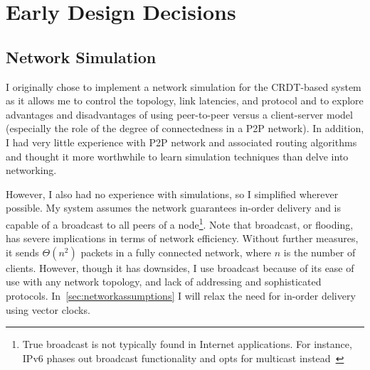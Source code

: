 \documentclass[12pt,a4paper,twoside,openright]{report}
\begin{document}
	
\section{Early Design Decisions}

	\subsection{Network Simulation}
	
	I originally chose to implement a network simulation for the CRDT-based system as it allows me to control the topology, link latencies, and protocol and to explore advantages and disadvantages of using peer-to-peer versus a client-server model (especially the role of the degree of connectedness in a P2P network). In addition, I had very little experience with P2P network and associated routing algorithms and thought it more worthwhile to learn simulation techniques than delve into networking.
	
	However, I also had no experience with simulations, so I simplified wherever possible. My system assumes the network guarantees in-order delivery and is capable of a broadcast to all peers of a node\footnote{True broadcast is not typically found in Internet applications. For instance, IPv6 phases out broadcast functionality and opts for multicast instead~\cite{RFC2460}}. Note that broadcast, or flooding, has severe implications in terms of network efficiency. Without further measures, it sends $\Theta (n^{2})$ packets in a fully connected network, where $n$ is the number of clients. However, though it has downsides, I use broadcast because of its ease of use with any network topology, and lack of addressing and sophisticated protocols. In~\cref{sec:networkassumptions} I will relax the need for in-order delivery using vector clocks.
	
	
	
\end{document}
